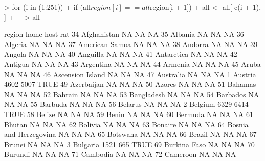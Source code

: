 \documentclass [a4paper] {article}
\begin{document}
\begin{Schunk}
\begin{Sinput}
> for (i in (1:251)) {
+   if (all$region[i] == all$region[i + 1]) {
+     all <- all[-c(i + 1), ]
+   }
+ }
> all
\end{Sinput}
\begin{Soutput}
                                 region  home  host  rat
34                          Afghanistan    NA    NA   NA
35                              Albania    NA    NA   NA
36                              Algeria    NA    NA   NA
37                       American Samoa    NA    NA   NA
38                              Andorra    NA    NA   NA
39                               Angola    NA    NA   NA
40                             Anguilla    NA    NA   NA
41                           Antarctica    NA    NA   NA
42                              Antigua    NA    NA   NA
43                            Argentina    NA    NA   NA
44                              Armenia    NA    NA   NA
45                                Aruba    NA    NA   NA
46                     Ascension Island    NA    NA   NA
47                            Australia    NA    NA   NA
1                               Austria  4602  5007 TRUE
49                           Azerbaijan    NA    NA   NA
50                               Azores    NA    NA   NA
51                              Bahamas    NA    NA   NA
52                              Bahrain    NA    NA   NA
53                           Bangladesh    NA    NA   NA
54                             Barbados    NA    NA   NA
55                              Barbuda    NA    NA   NA
56                              Belarus    NA    NA   NA
2                               Belgium  6329  6414 TRUE
58                               Belize    NA    NA   NA
59                                Benin    NA    NA   NA
60                              Bermuda    NA    NA   NA
61                               Bhutan    NA    NA   NA
62                              Bolivia    NA    NA   NA
63                              Bonaire    NA    NA   NA
64               Bosnia and Herzegovina    NA    NA   NA
65                             Botswana    NA    NA   NA
66                               Brazil    NA    NA   NA
67                               Brunei    NA    NA   NA
3                              Bulgaria  1521   665 TRUE
69                         Burkina Faso    NA    NA   NA
70                              Burundi    NA    NA   NA
71                             Cambodia    NA    NA   NA
72                             Cameroon    NA    NA   NA

\end{Soutput}
\end{Schunk}
\end{document}
